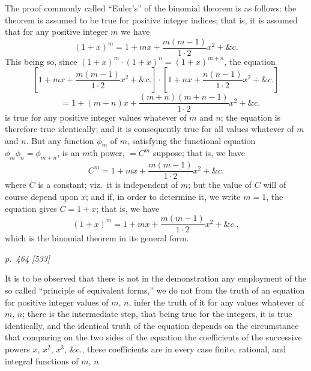 \documentclass[11pt,a4paper]{article}
\theoremstyle{plain}
\theoremstyle{definition}
\begin{document}
The proof commonly called ``Euler's'' of the binomial theorem is as follows: the
theorem is assumed to be true for positive integer indices; that is, it is assumed that
for any positive integer $m$ we have
\[
(1 + x)^m = 1 + mx + \frac{m(m-1)}{1\cdot 2}x^2 + \&c.
\]
This being so, since $(1 + x)^m \cdot (1 + x)^n = (1 + x)^{m+n}$, the equation
\[
\left[1 + mx + \frac{m(m-1)}{1\cdot 2}x^2 + \&c.\right]\cdot\left[1 + nx + \frac{n(n-1)}{1\cdot 2}x^2 + \&c.\right]
\]
\[
\quad = 1 + (m + n)x + \frac{(m + n)(m + n - 1)}{1\cdot 2}x^2 + \&c.
\]
is true for any positive integer values whatever of $m$ and $n$; the equation is therefore
true identically; and it is consequently true for all values whatever of $m$ and $n$.
But any function $\phi_m$ of $m$, satisfying the functional equation
$\phi_m\phi_n=\phi_{m+n}$, is an $m$th power, $=C^m$ suppose; that is, we have
\[
C^m = 1 + mx + \frac{m(m-1)}{1\cdot 2}x^2 + \&c.
\]
where $C$ is a constant; viz.\ it is independent of $m$; but the value of $C$ will of course depend upon $x$; and if, in order to determine it, we write $m=1$, the equation gives
$C=1+x$; that is, we have
\[
(1 + x)^m = 1 + mx + \frac{m(m-1)}{1\cdot 2}x^2 + \&c.,
\]
which is the binomial theorem in its general form.

\clearpage

\bigskip
\textit{p.~464 [533]}
\smallskip

It is to be observed that there is not in the demonstration any employment of
the so called ``principle of equivalent forms,'' we do not from the truth of an equation
for positive integer values of $m$, $n$, infer the truth of it for any values whatever of
$m$, $n$; there is the intermediate step, that being true for the integers, it is true identically,
and the identical truth of the equation depends on the circumstance that comparing
on the two sides of the equation the coefficients of the successive powers $x$, $x^2$, $x^3$, \&c.,
these coefficients are in every case finite, rational, and integral functions of $m$, $n$.
\end{document}
